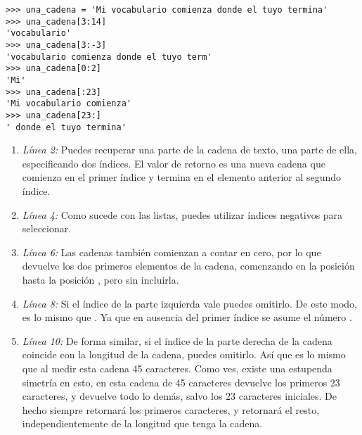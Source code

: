 \noindent\begin{minipage}{\textwidth}
\begin{lstlisting}[mathescape=True]
>>> una_cadena = 'Mi vocabulario comienza donde el tuyo termina'
>>> una_cadena[3:14]
'vocabulario'
>>> una_cadena[3:-3]
'vocabulario comienza donde el tuyo term'
>>> una_cadena[0:2]
'Mi'
>>> una_cadena[:23]
'Mi vocabulario comienza'
>>> una_cadena[23:]
' donde el tuyo termina'
\end{lstlisting}
\end{minipage}

\begin{enumerate}

\item \emph{Línea 2:} Puedes recuperar una parte de la cadena de texto, una parte de ella, especificando dos índices. El valor de retorno es una nueva cadena que comienza en el primer índice y termina en el elemento anterior al segundo índice.

\item \emph{Línea 4:} Como sucede con las listas, puedes utilizar índices negativos para seleccionar.

\item \emph{Línea 6:} Las cadenas también comienzan a contar en cero, por lo que  devuelve los dos primeros elementos de la cadena, comenzando en la posición  hasta la posición , pero sin incluirla.

\item \emph{Línea 8:} Si el índice de la parte izquierda vale  puedes omitirlo. De este modo,  es lo mismo que . Ya que en ausencia del primer índice se asume el número .

\item \emph{Línea 10:} De forma similar, si el índice de la parte derecha de la cadena coincide con la longitud de la cadena, puedes omitirlo. Así que  es lo mismo que  al medir esta cadena 45 caracteres. Como ves, existe una estupenda simetría en esto, en esta cadena de 45 caracteres  devuelve los primeros 23 caracteres, y  devuelve todo lo demás, salvo los 23 caracteres iniciales. De hecho  siempre retornará los primeros  caracteres, y  retornará el resto, independientemente de la longitud que tenga la cadena.

\end{enumerate}

